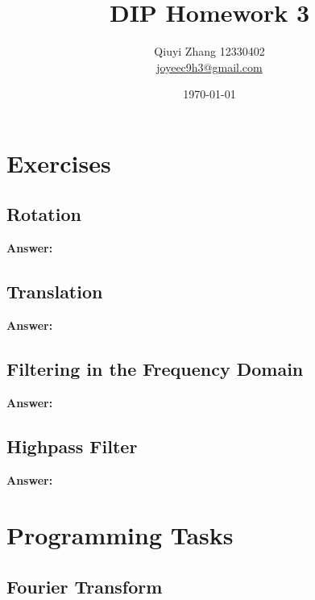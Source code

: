\documentclass{article}
\begin{document}
\title{DIP Homework 3}
\author{Qiuyi Zhang 12330402 \\ \href{mailto:joyeec9h3@gmail.com}{joyeec9h3@gmail.com}} 
\date{\today}
\maketitle
\tableofcontents
\section{Exercises}

\subsection{Rotation}

\textbf{Answer:} 

\subsection{Translation}

\textbf{Answer:}

\subsection{Filtering in the Frequency Domain}

\textbf{Answer:}

\subsection{Highpass Filter}

\textbf{Answer:}

\section{Programming Tasks}
\subsection{Fourier Transform}
\end{document}
